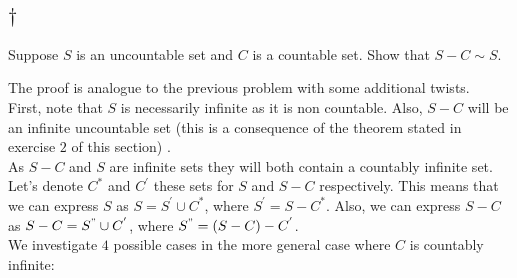 \subsection{$\dagger$}
\begin{tcolorbox}
Suppose $S$ is an uncountable set and $C$ is a countable set. Show that $S - C\sim S$. 
\end{tcolorbox}

The proof is analogue to the previous problem with some additional twists.\\
First, note that $S$ is necessarily infinite as it is non countable. Also, $S - C$ will be an infinite uncountable set (this is a consequence of the theorem stated in exercise $2$ of this section) . \\
As $S - C$ and  $S$ are infinite sets they will both contain a countably infinite set. \\
Let's denote $C^*$ and $C^{'}$ these sets for $S$ and $S-C$ respectively. This means that we can express $S$ as $S=S^{'}\cup C^*$, where $S^{'}= S-C^*$. Also, we can express $S-C$ as $S-C=S^{"}\cup C^{'}$, where $S^{"}= (S- C)-C^{'}$.\\
We investigate $4$ possible cases in the more general case where $C$ is countably infinite:\\

